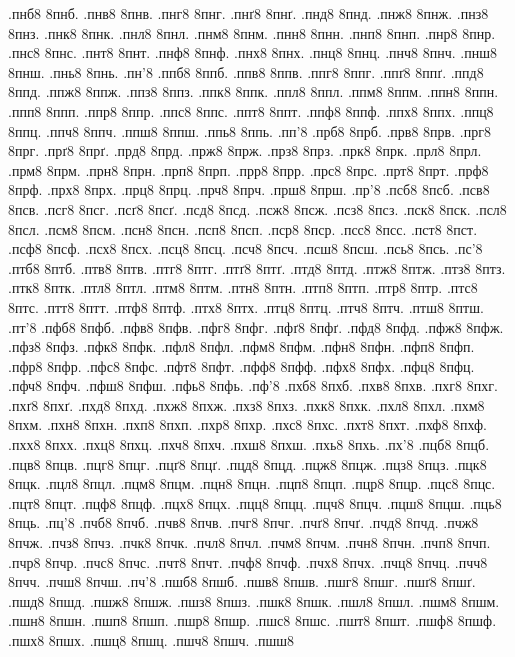 {.пнб8
8пнб.
.пнв8
8пнв.
.пнг8
8пнг.
.пнґ8
8пнґ.
.пнд8
8пнд.
.пнж8
8пнж.
.пнз8
8пнз.
.пнк8
8пнк.
.пнл8
8пнл.
.пнм8
8пнм.
.пнн8
8пнн.
.пнп8
8пнп.
.пнр8
8пнр.
.пнс8
8пнс.
.пнт8
8пнт.
.пнф8
8пнф.
.пнх8
8пнх.
.пнц8
8пнц.
.пнч8
8пнч.
.пнш8
8пнш.
.пнь8
8пнь.
.пн'8
.ппб8
8ппб.
.ппв8
8ппв.
.ппг8
8ппг.
.ппґ8
8ппґ.
.ппд8
8ппд.
.ппж8
8ппж.
.ппз8
8ппз.
.ппк8
8ппк.
.ппл8
8ппл.
.ппм8
8ппм.
.ппн8
8ппн.
.ппп8
8ппп.
.ппр8
8ппр.
.ппс8
8ппс.
.ппт8
8ппт.
.ппф8
8ппф.
.ппх8
8ппх.
.ппц8
8ппц.
.ппч8
8ппч.
.ппш8
8ппш.
.ппь8
8ппь.
.пп'8
.прб8
8прб.
.прв8
8прв.
.прг8
8прг.
.прґ8
8прґ.
.прд8
8прд.
.прж8
8прж.
.прз8
8прз.
.прк8
8прк.
.прл8
8прл.
.прм8
8прм.
.прн8
8прн.
.прп8
8прп.
.прр8
8прр.
.прс8
8прс.
.прт8
8прт.
.прф8
8прф.
.прх8
8прх.
.прц8
8прц.
.прч8
8прч.
.прш8
8прш.
.пр'8
.псб8
8псб.
.псв8
8псв.
.псг8
8псг.
.псґ8
8псґ.
.псд8
8псд.
.псж8
8псж.
.псз8
8псз.
.пск8
8пск.
.псл8
8псл.
.псм8
8псм.
.псн8
8псн.
.псп8
8псп.
.пср8
8пср.
.псс8
8псс.
.пст8
8пст.
.псф8
8псф.
.псх8
8псх.
.псц8
8псц.
.псч8
8псч.
.псш8
8псш.
.псь8
8псь.
.пс'8
.птб8
8птб.
.птв8
8птв.
.птг8
8птг.
.птґ8
8птґ.
.птд8
8птд.
.птж8
8птж.
.птз8
8птз.
.птк8
8птк.
.птл8
8птл.
.птм8
8птм.
.птн8
8птн.
.птп8
8птп.
.птр8
8птр.
.птс8
8птс.
.птт8
8птт.
.птф8
8птф.
.птх8
8птх.
.птц8
8птц.
.птч8
8птч.
.птш8
8птш.
.пт'8
.пфб8
8пфб.
.пфв8
8пфв.
.пфг8
8пфг.
.пфґ8
8пфґ.
.пфд8
8пфд.
.пфж8
8пфж.
.пфз8
8пфз.
.пфк8
8пфк.
.пфл8
8пфл.
.пфм8
8пфм.
.пфн8
8пфн.
.пфп8
8пфп.
.пфр8
8пфр.
.пфс8
8пфс.
.пфт8
8пфт.
.пфф8
8пфф.
.пфх8
8пфх.
.пфц8
8пфц.
.пфч8
8пфч.
.пфш8
8пфш.
.пфь8
8пфь.
.пф'8
.пхб8
8пхб.
.пхв8
8пхв.
.пхг8
8пхг.
.пхґ8
8пхґ.
.пхд8
8пхд.
.пхж8
8пхж.
.пхз8
8пхз.
.пхк8
8пхк.
.пхл8
8пхл.
.пхм8
8пхм.
.пхн8
8пхн.
.пхп8
8пхп.
.пхр8
8пхр.
.пхс8
8пхс.
.пхт8
8пхт.
.пхф8
8пхф.
.пхх8
8пхх.
.пхц8
8пхц.
.пхч8
8пхч.
.пхш8
8пхш.
.пхь8
8пхь.
.пх'8
.пцб8
8пцб.
.пцв8
8пцв.
.пцг8
8пцг.
.пцґ8
8пцґ.
.пцд8
8пцд.
.пцж8
8пцж.
.пцз8
8пцз.
.пцк8
8пцк.
.пцл8
8пцл.
.пцм8
8пцм.
.пцн8
8пцн.
.пцп8
8пцп.
.пцр8
8пцр.
.пцс8
8пцс.
.пцт8
8пцт.
.пцф8
8пцф.
.пцх8
8пцх.
.пцц8
8пцц.
.пцч8
8пцч.
.пцш8
8пцш.
.пць8
8пць.
.пц'8
.пчб8
8пчб.
.пчв8
8пчв.
.пчг8
8пчг.
.пчґ8
8пчґ.
.пчд8
8пчд.
.пчж8
8пчж.
.пчз8
8пчз.
.пчк8
8пчк.
.пчл8
8пчл.
.пчм8
8пчм.
.пчн8
8пчн.
.пчп8
8пчп.
.пчр8
8пчр.
.пчс8
8пчс.
.пчт8
8пчт.
.пчф8
8пчф.
.пчх8
8пчх.
.пчц8
8пчц.
.пчч8
8пчч.
.пчш8
8пчш.
.пч'8
.пшб8
8пшб.
.пшв8
8пшв.
.пшг8
8пшг.
.пшґ8
8пшґ.
.пшд8
8пшд.
.пшж8
8пшж.
.пшз8
8пшз.
.пшк8
8пшк.
.пшл8
8пшл.
.пшм8
8пшм.
.пшн8
8пшн.
.пшп8
8пшп.
.пшр8
8пшр.
.пшс8
8пшс.
.пшт8
8пшт.
.пшф8
8пшф.
.пшх8
8пшх.
.пшц8
8пшц.
.пшч8
8пшч.
.пшш8
}
